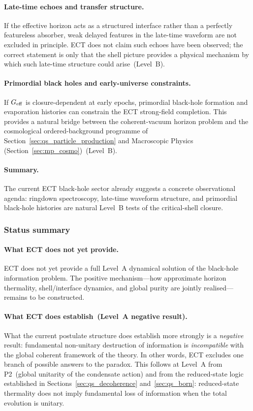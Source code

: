 \paragraph{Late-time echoes and transfer structure.}
If the effective horizon acts as a structured interface rather than a
perfectly featureless absorber, weak delayed features in the late-time
waveform are not excluded in principle.
ECT does not claim such echoes have been observed; the correct statement
is only that the shell picture provides a physical mechanism by which
such late-time structure could arise~(Level~B).

\paragraph{Primordial black holes and early-universe constraints.}
If $G_{\rm eff}$ is closure-dependent at early epochs, primordial
black-hole formation and evaporation histories can constrain the ECT
strong-field completion.
This provides a natural bridge between the coherent-vacuum horizon
problem and the cosmological ordered-background programme of
Section~\ref{sec:qs_particle_production} and Macroscopic Physics
(Section~\ref{sec:mp_cosmo})~(Level~B).

\paragraph{Summary.}
The current ECT black-hole sector already suggests a concrete
observational agenda: ringdown spectroscopy, late-time waveform
structure, and primordial black-hole histories are natural Level~B
tests of the critical-shell closure.

\subsubsection*{Status summary}

\paragraph{What ECT does not yet provide.}
ECT does not yet provide a full Level~A dynamical solution of the
black-hole information problem.
The positive mechanism---how approximate horizon thermality,
shell/interface dynamics, and global purity are jointly
realised---remains to be constructed.

\paragraph{What ECT does establish~(Level~A negative result).}
What the current postulate structure does establish more strongly
is a \emph{negative} result:
fundamental non-unitary destruction of information is
\emph{incompatible} with the global coherent framework of the theory.
In other words, ECT excludes one branch of possible answers to the
paradox.
This follows at Level~A from P2~(global unitarity of the condensate
action) and from the reduced-state logic established in
Sections~\ref{sec:qs_decoherence} and~\ref{sec:qs_born}:
reduced-state thermality does not imply fundamental loss of
information when the total evolution is unitary.

